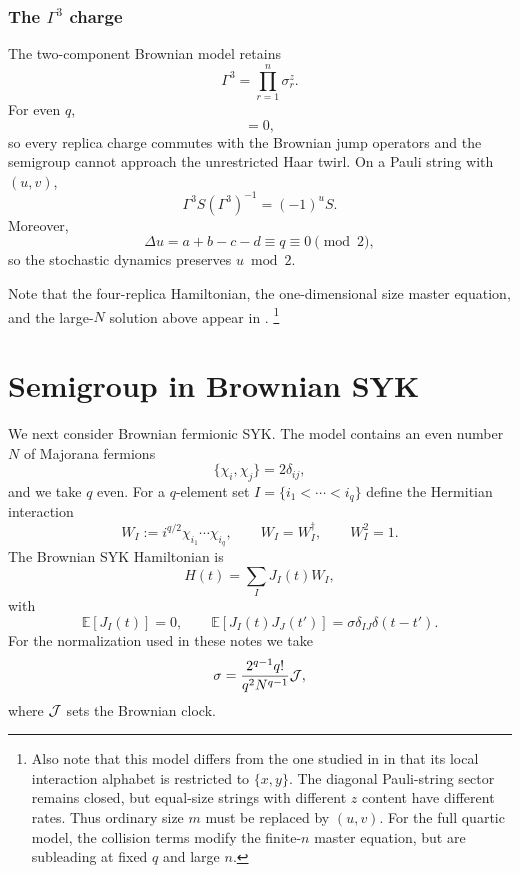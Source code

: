 \documentclass{article}
\theoremstyle{definition}
\begin{document}
\subsubsection{The $\Gamma^3$ charge}

The two-component Brownian model retains
\begin{equation}
    \Gamma^3=\prod_{r=1}^n\sigma_r^z.
\end{equation}
For even $q$,
\begin{equation}
    [\Gamma^3,V_I]=0,
\end{equation}
so every replica charge commutes with the Brownian jump operators and the
semigroup cannot approach the unrestricted Haar twirl.  On a Pauli string
with $(u,v)$,
\begin{equation}
    \Gamma^3S(\Gamma^3)^{-1}=(-1)^uS.
\end{equation}
Moreover,
\begin{equation}
    \Delta u=a+b-c-d\equiv q\equiv0\pmod2,
\end{equation}
so the stochastic dynamics preserves $u\bmod2$.

Note that the four-replica
Hamiltonian, the one-dimensional size master equation, and the large-$N$ solution above appear in \cite{xu2025dynamics}. \footnote{Also note that this model differs from the one studied in \cite{basu2026complexity} in that its local interaction alphabet is restricted to $\{x,y\}$. The diagonal Pauli-string sector remains closed,
but equal-size strings with different $z$ content have different rates.
Thus ordinary size $m$ must be replaced by $(u,v)$.  For the full quartic
model, the collision terms modify the finite-$n$ master equation, but are
subleading at fixed $q$ and large $n$.}





\section{Semigroup in Brownian SYK}
\label{sec:brownian_syk}

We next consider Brownian fermionic SYK.  The model contains an even number
$N$ of Majorana fermions
\begin{equation}
    \{\chi_i,\chi_j\}=2\delta_{ij},
\end{equation}
and we take $q$ even.  For a $q$-element set
$I=\{i_1<\cdots<i_q\}$ define the Hermitian interaction
\begin{equation}
    W_I:=i^{q/2}\chi_{i_1}\cdots\chi_{i_q},
    \qquad
    W_I=W_I^\dagger,
    \qquad
    W_I^2=1.
\end{equation}
The Brownian SYK Hamiltonian is
\begin{equation}
    H(t)=\sum_IJ_I(t)W_I,
\end{equation}
with
\begin{equation}
    \mathbb E[J_I(t)]=0,
    \qquad
    \mathbb E[J_I(t)J_J(t')]
    =\sigma\delta_{IJ}\delta(t-t').
\end{equation}
For the normalization used in these notes we take
\begin{equation}
    \sigma=\frac{2^{q-1}q!}{q^2N^{q-1}}{\cal J},
\end{equation}
where ${\cal J}$ sets the Brownian clock.
\end{document}
